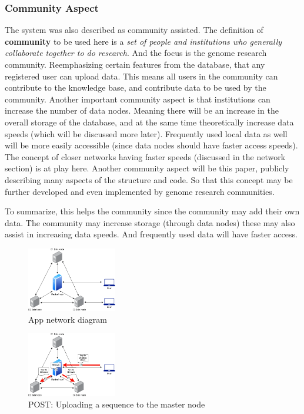 \documentclass[acmsmall]{acmart}
\begin{document}
\subsubsection{Community Aspect} \label{community}
The system was also described as community assisted. The definition of \textbf{community} to be used here is a \textit{set of people and institutions who generally collaborate together to do research}. And the focus is the genome research community. Reemphasizing certain features from the database, that any registered user can upload data. This means all users in the community can contribute to the knowledge base, and contribute data to be used by the community. Another important community aspect is that institutions can increase the number of data nodes. Meaning there will be an increase in the overall storage of the database, and at the same time theoretically increase data speeds (which will be discussed more later). Frequently used local data as well will be more easily accessible (since data nodes should have faster access speeds). The concept of closer networks having faster speeds (discussed in the network section) is at play here. Another community aspect will be this paper, publicly describing many aspects of the structure and code. So that this concept may be further developed and even implemented by genome research communities.

To summarize, this helps the community since the community may add their own data. The community may increase storage (through data nodes) these may also assist in increasing data speeds. And frequently used data will have faster access. 



\begin{figure}[h]
\caption{App network diagram}
\centering
\includegraphics[width=0.35\textwidth]{images/thesis1.png} 
\end{figure}

\begin{figure}[h]
\caption{POST: Uploading a sequence to the master node}
\centering
\includegraphics[width=0.35\textwidth]{images/thesis3.png} 
\end{figure}
\end{document}
